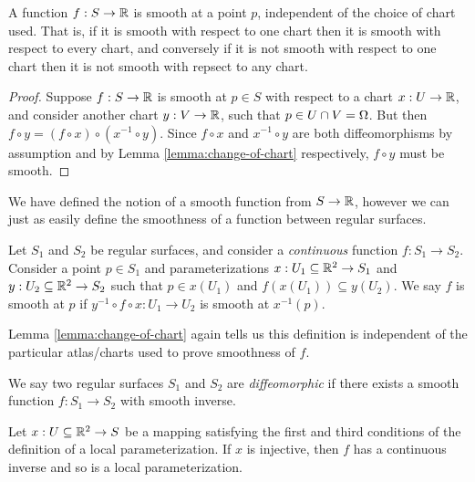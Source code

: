 \begin{lemma}
    A function $f: S \to \mathbb{R}$ is smooth at a point $p$, independent of the choice of chart used. That is, if it is smooth with respect to one chart then it is smooth with respect to every chart, and conversely if it is not smooth with respect to one chart then it is not smooth with repsect to any chart.
\end{lemma}

\begin{proof}
    Suppose $f: S \to \mathbb{R}$ is smooth at $p \in S$ with respect to a chart $x: U \to \mathbb{R}$, and consider another chart $y: V \to \mathbb{R}$, such that $p \in U \cap V = \Omega$. But then $f \circ y = (f \circ x) \circ (x^{-1} \circ y)$. Since $f \circ x$ and $x^{-1} \circ y$ are both diffeomorphisms by assumption and by Lemma \ref{lemma:change-of-chart} respectively, $f \circ y$ must be smooth.
\end{proof}

\begin{rmk}
    We have defined the notion of a smooth function from $S \to \mathbb{R}$, however we can just as easily define the smoothness of a function between regular surfaces.
\end{rmk}

\begin{defn}
    Let $S_1$ and $S_2$ be regular surfaces, and consider a \emph{continuous} function $f: S_1 \to S_2$. Consider a point $p \in S_1$ and parameterizations $x: U_1 \subseteq \mathbb{R}^2 \to S_1$ and $y: U_2 \subseteq \mathbb{R}^2 \to S_2$ such that $p \in x(U_1)$ and $f(x(U_1)) \subseteq y(U_2)$. We say $f$ is smooth at $p$ if $y^{-1} \circ f \circ x: U_1 \to U_2$ is smooth at $x^{-1}(p)$.
\end{defn}

\begin{prop}
    Lemma \ref{lemma:change-of-chart} again tells us this definition is independent of the particular atlas/charts used to prove smoothness of $f$.
\end{prop}

\begin{defn}
    We say two regular surfaces $S_1$ and $S_2$ are \emph{diffeomorphic} if there exists a smooth function $f: S_1 \to S_2$ with smooth inverse.
\end{defn}

\begin{prop}
    Let $x: U \subseteq \mathbb{R}^2 \to S$ be a mapping satisfying the first and third conditions of the definition of a local parameterization. If $x$ is injective, then $f$ has a continuous inverse and so is a local parameterization.
\end{prop}

